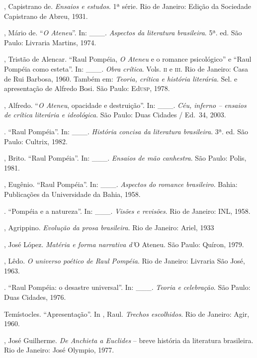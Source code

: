 \begin{bibliohedra}
, Capistrano de. \textit{Ensaios e estudos}.
1ª série. Rio de Janeiro: Edição da Sociedade
Capistrano de Abreu, 1931.

, Mário de. ``\textit{O Ateneu}''. In: \_\_\_. \textit{Aspectos da
literatura brasileira}. 5ª. ed. São Paulo: Livraria
Martins, 1974.

, Tristão de Alencar. ``Raul Pompéia,
\textit{O Ateneu} e o romance psicológico'' e ``Raul Pompéia como
esteta''. In: \_\_\_. \textit{Obra crítica}. Vols. \textsc{ii} e \textsc{iii}. Rio de
Janeiro: Casa de Rui Barbosa, 1960. Também em: \textit{Teoria, crítica
e história literária}. Sel. e apresentação de Alfredo Bosi. São Paulo:
Ed\textsc{usp}, 1978.  

, Alfredo. ``\textit{O Ateneu}, opacidade e
destruição''. In: \_\_\_. \textit{Céu, inferno -- ensaios de crítica
literária e ideológica}. São Paulo: Duas Cidades / Ed.~34, 2003.

\titidem. ``Raul Pompéia''. In: \_\_\_. \textit{História concisa da
literatura brasileira}. 3ª. ed. São Paulo: Cultrix,
1982.

, Brito. ``Raul Pompéia''. In: \_\_\_. 
\textit{Ensaios de mão canhestra}. São Paulo: Polis, 1981.

, Eugênio. ``Raul Pompéia''. In: \_\_\_.
\textit{Aspectos do romance brasileiro}. Bahia: Publicações da
Universidade da Bahia, 1958.

\titidem. ``Pompéia e a natureza''. In: \_\_\_. \textit{Visões e
revisões}. Rio de Janeiro: INL, 1958.

, Agrippino. \textit{Evolução da prosa brasileira}. Rio
de Janeiro: Ariel, 1933

, José López. \textit{Matéria e forma narrativa
d'}O Ateneu. São Paulo: Quíron, 1979.

, Lêdo. \textit{O universo poético de Raul Pompéia}.
Rio de Janeiro: Livraria São José, 1963.

\titidem. ``Raul Pompéia: o desastre universal''. In: \_\_\_.
\textit{Teoria e celebração}. São Paulo: Duas Cidades, 1976.

 Temístocles. ``Apresentação''. In , Raul.
\textit{Trechos escolhidos}. Rio de Janeiro: Agir, 1960.

, José Guilherme. \textit{De Anchieta a Euclides} -- breve
história da literatura brasileira. Rio de Janeiro: José Olympio, 1977.


\end{bibliohedra}
